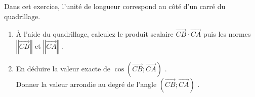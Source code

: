 
%
Dans cet exercice, l'unité de longueur correspond au côté d'un carré du quadrillage.
\begin{center}
\end{center}
\begin{enumerate}
     \item
     À l'aide du quadrillage, calculez le produit scalaire  $ \overrightarrow{CB}  \cdot \overrightarrow{CA} $ puis les normes
     $\left\Vert \overrightarrow{CB} \right\Vert $ et $\left\Vert \overrightarrow{CA} \right\Vert $ .
     \item
     En déduire la valeur exacte de $ \cos\left( \overrightarrow{CB} ;\overrightarrow{CA}  \right) $ .\\
     Donner la valeur arrondie au degré de l'angle $ \left( \overrightarrow{CB} ; \overrightarrow{CA}  \right)$ .
\end{enumerate}

